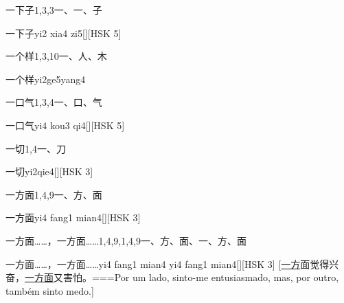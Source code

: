 \begin{Entry}{一下子}{1,3,3}{⼀、⼀、⼦}
  \begin{Phonetics}{一下子}{yi2 xia4 zi5}[][HSK 5]
  \end{Phonetics}
\end{Entry}

\begin{Entry}{一个样}{1,3,10}{⼀、⼈、⽊}
  \begin{Phonetics}{一个样}{yi2ge5yang4}
  \end{Phonetics}
\end{Entry}

\begin{Entry}{一口气}{1,3,4}{⼀、⼝、⽓}
  \begin{Phonetics}{一口气}{yi4 kou3 qi4}[][HSK 5]
  \end{Phonetics}
\end{Entry}

\begin{Entry}{一切}{1,4}{⼀、⼑}
  \begin{Phonetics}{一切}{yi2qie4}[][HSK 3]
  \end{Phonetics}
\end{Entry}

\begin{Entry}{一方面}{1,4,9}{⼀、⽅、⾯}
  \begin{Phonetics}{一方面}{yi4 fang1 mian4}[][HSK 3]
  \end{Phonetics}
\end{Entry}

\begin{Entry}{一方面……，一方面……}{1,4,9,1,4,9}{⼀、⽅、⾯、⼀、⽅、⾯}
  \begin{Phonetics}{一方面……，一方面……}{yi4 fang1 mian4 yi4 fang1 mian4}[][HSK 3]
    [\underline{一方}面觉得兴奋，\underline{一方面}又害怕。===Por um lado, sinto-me entusiasmado, mas, por outro, também sinto medo.]
  \end{Phonetics}
\end{Entry}

